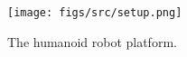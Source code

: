 \begin{figure}[ht]
    \centering
    \texttt{[image: figs/src/setup.png]}
    \caption{The humanoid robot platform.}
    \label{fig:humanoid}
\end{figure}